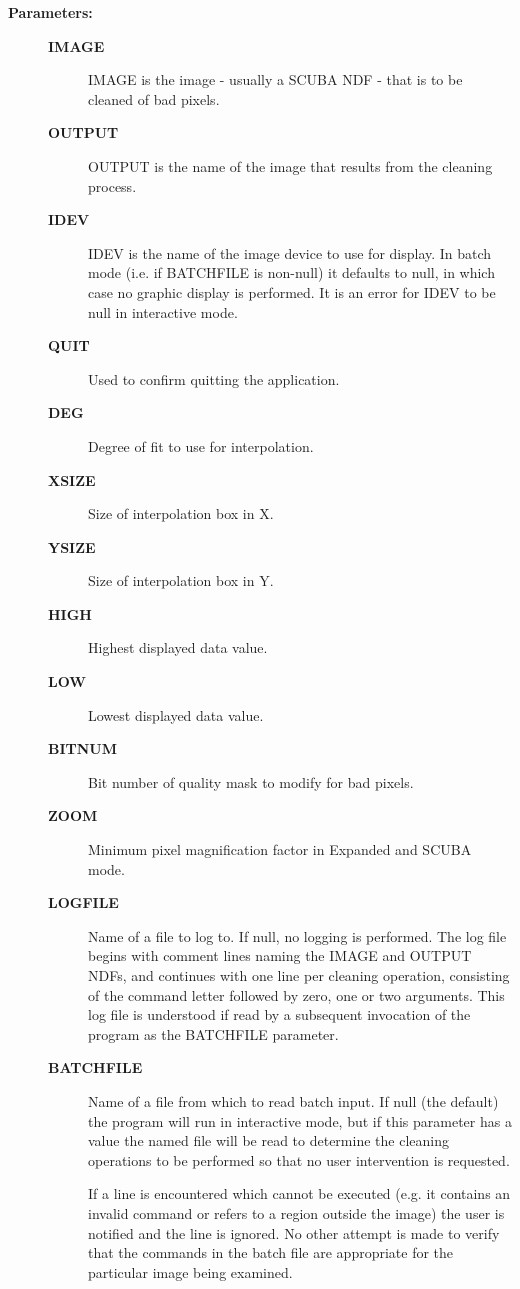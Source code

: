 \begin{description}
\item [{\bf Parameters:}]
\begin{description}
\item [{\bf IMAGE}]
 IMAGE is the image - usually a SCUBA NDF - that is to be
 cleaned of bad pixels.
\item [{\bf OUTPUT}]
 OUTPUT is the name of the image that results from the cleaning
 process.
\item [{\bf IDEV}]
 IDEV is the name of the image device to use for display.  In batch
 mode (i.e. if BATCHFILE is non-null) it defaults to null, in which
 case no graphic display is performed.  It is an error for IDEV to
 be null in interactive mode.
\item [{\bf QUIT}]
 Used to confirm quitting the application.
\item [{\bf DEG}]
 Degree of fit to use for interpolation.
\item [{\bf XSIZE}]
 Size of interpolation box in X.
\item [{\bf YSIZE}]
 Size of interpolation box in Y.
\item [{\bf HIGH}]
 Highest displayed data value.
\item [{\bf LOW}]
 Lowest displayed data value.
\item [{\bf BITNUM}]
 Bit number of quality mask to modify for bad pixels.
\item [{\bf ZOOM}]
 Minimum pixel magnification factor in Expanded and SCUBA mode.
\item [{\bf LOGFILE}]
 Name of a file to log to.  If null, no logging is performed.
 The log file begins with comment lines naming the IMAGE and OUTPUT
 NDFs, and continues with one line per cleaning operation,
 consisting of the command letter followed by zero, one or two
 arguments.  This log file is understood if read by a subsequent
 invocation of the program as the BATCHFILE parameter.
\item [{\bf BATCHFILE}]
 Name of a file from which to read batch input.  If null (the default)
 the program will run in interactive mode, but if this parameter has a
 value the named file will be read to determine the cleaning operations
 to be performed so that no user intervention is requested.

 If a line is encountered which cannot be executed (e.g. it contains
 an invalid command or refers to a region outside the image) the user
 is notified and the line is ignored.  No other attempt is made to
 verify that the commands in the batch file are appropriate for the
 particular image being examined.


\end{description}
\end{description}
